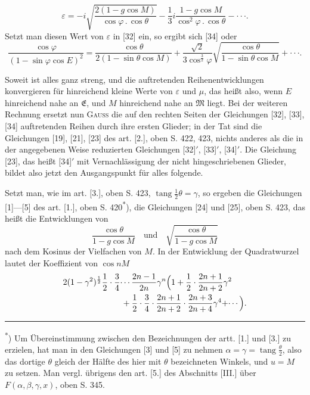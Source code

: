 \begin{equation}\tag*{[33]$'$}
\varepsilon=-i\sqrt{\frac{2(1-g\cos M)}{\cos\varphi\,{.}\,\cos\theta}}-\frac13 i\frac{1-g\cos M}{\cos^2\varphi\,{.}\,\cos\theta}-\cdotp\cdotp\cdotp.
\end{equation}
\noindent Setzt man diesen Wert von \(\varepsilon\) in [32] ein, so ergibt sich [34] oder
\begin{equation}\tag*{[34]$'$}
\frac{\cos\varphi}{(1-\sin\varphi\cos E)^2}=\frac{\cos\theta}{2(1-\sin\theta\cos M)}+\frac{\surd2}{3\cos^{\frac32}\varphi}\sqrt{\frac{\cos\theta}{1-\sin\theta\cos M}}+\cdotp\cdotp\cdotp.
\end{equation}

\indent Soweit ist alles ganz streng, und die auftretenden Reihenentwicklungen konvergieren für hinreichend kleine Werte von \(\varepsilon\) und \(\mu\), das heißt also, wenn \(E\) hinreichend nahe an \(\mathfrak E\), und \(M\) hinreichend nahe an \(\mathfrak M\) liegt. Bei der weiteren Rechnung ersetzt nun \textsc{Gauss} die auf den rechten Seiten der Gleichungen [32], [33], [34] auftretenden Reihen durch ihre ersten Glieder; in der Tat sind die Gleichungen [19], [21], [23] des art. [2.], oben S. 422, 423, nichts anderes als die in der angegebenen Weise reduzierten Gleichungen [32]$'$, [33]$'$, [34]$'$. Die Gleichung [23], das heißt [34]$'$ mit Vernachlässigung der nicht hingeschriebenen Glieder, bildet also jetzt den Ausgangspunkt für alles folgende.

\indent Setzt man, wie im art. [3.], oben S. 423, \(\operatorname{tang}\tfrac12\theta=\gamma\), so ergeben die Gleichungen [1]—[5] des art. [1.], oben S. 420\textsuperscript{*}), die Gleichungen [24] und [25], oben S. 423, das heißt die Entwicklungen von
\[\frac{\cos\theta}{1-g\cos M}\quad\text{und}\quad\sqrt{\frac{\cos\theta}{1-g\cos M}}\]
\noindent nach dem Kosinus der Vielfachen von \(M\). In der Entwicklung der Quadratwurzel lautet der Koeffizient von \(\cos nM\)
\[\begin{aligned}
&2(1-\gamma^2)^{\frac12}\frac12\cdot\frac34\cdotp\cdotp\cdotp\frac{2n-1}{2n}\gamma^n\Bigl(1+\frac12\cdot\frac{2n+1}{2n+2}\gamma^2\\
&\hspace{7em}+\frac12\cdot\frac34\cdot\frac{2n+1}{2n+2}\cdot\frac{2n+3}{2n+4}\gamma^4+\cdotp\cdotp\cdotp\Bigr).
\end{aligned}\]
\par\medskip\noindent\rule{.24\linewidth}{.4pt}\par\smallskip
\noindent\hspace*{\parindent}\textsuperscript{*}) Um Übereinstimmung zwischen den Bezeichnungen der artt. [1.] und [3.] zu erzielen, hat man in den Gleichungen [3] und [5] zu nehmen \(\alpha=\gamma=\operatorname{tang}\frac\theta2\), also das dortige \(\theta\) gleich der Hälfte des hier mit \(\theta\) bezeichneten Winkels, und \(u=M\) zu setzen. Man vergl. übrigens den art. [5.] des Abschnitts [III.] über \(F(\alpha,\beta,\gamma,x)\), oben S. 345.
\par\endgroup
{}

